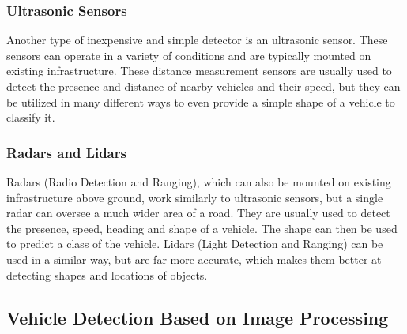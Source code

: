 \subsubsection*{Ultrasonic Sensors}

Another type of inexpensive and simple detector is an ultrasonic
sensor.\cite{UltrasonicSensors} These sensors can operate in a variety of
conditions and are typically mounted on existing infrastructure. These distance
measurement sensors are usually used to detect the presence and distance of nearby
vehicles and their speed, but they can be utilized in many different ways to
even provide a simple shape of a vehicle to classify it.


\subsubsection*{Radars and Lidars}

Radars (Radio Detection and Ranging), which can also be mounted on existing
infrastructure above ground, work similarly to ultrasonic sensors, but a single
radar can oversee a much wider area of a road.\cite{RadarSensors} They are
usually used to detect the presence, speed, heading and shape of a vehicle. The
shape can then be used to predict a class of the vehicle. Lidars (Light
Detection and Ranging) can be used in a similar way, but are far more accurate,
which makes them better at detecting shapes and locations of objects.



\subsection{Vehicle Detection Based on Image Processing}







